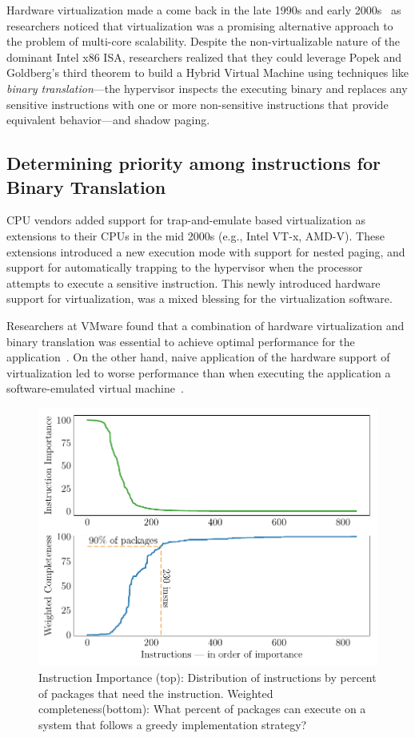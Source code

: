 Hardware virtualization made a come back in the late 1990s and early
2000s~\cite{bugnion-disco, denali, xen} as researchers noticed that
virtualization was a promising alternative approach to the problem of
multi-core scalability. Despite the non-virtualizable nature of the dominant
Intel x86 ISA, researchers realized that they could leverage Popek and
Goldberg's third theorem to build a Hybrid Virtual Machine using techniques
like \emph{binary translation}---the hypervisor inspects the executing binary
and replaces any sensitive instructions with one or more non-sensitive
instructions that provide equivalent behavior---and shadow paging.

\subsection{Determining priority among instructions for Binary Translation}

CPU vendors added support for trap-and-emulate based virtualization as
extensions to their CPUs in the mid 2000s (e.g., Intel VT-x, AMD-V).
These extensions introduced a new execution mode with support for nested
paging, and support for automatically trapping to the hypervisor when the
processor attempts to execute a sensitive instruction. This newly introduced
hardware support for virtualization, was a mixed blessing for the
virtualization software.

Researchers at VMware found that a combination of hardware virtualization and
binary translation was essential to achieve optimal performance for the
application~\cite{vmware-esx-bt-plus-vtx}. On the other hand, naive
application of the hardware support of virtualization led to worse performance
than when executing the application a software-emulated virtual machine~\cite{Adams2006-qw}.

\begin{figure}[t!]
	\centering
	\includegraphics[width=0.5\linewidth]{figures/WCvMnem.pdf}
	\caption{ Instruction Importance (top): Distribution of instructions by percent of packages that need the instruction. Weighted completeness(bottom): What percent of packages can execute on a system that follows a greedy implementation strategy?}
	\label{fig:WCvMnem}
\end{figure}

